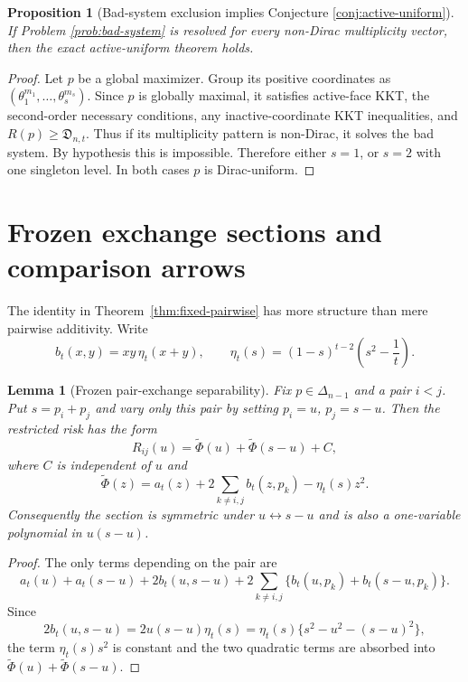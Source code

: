\documentclass[11pt]{article}
\newtheorem{lemma}[theorem]{Lemma}
\newtheorem{proposition}[theorem]{Proposition}
\theoremstyle{definition}
\begin{document}
\begin{proposition}[Bad-system exclusion implies Conjecture \ref{conj:active-uniform}]
If Problem \ref{prob:bad-system} is resolved for every non-Dirac multiplicity vector, then the exact active-uniform theorem holds.
\end{proposition}

\begin{proof}
Let $p$ be a global maximizer.  Group its positive coordinates as $(\theta_1^{m_1},\ldots,\theta_s^{m_s})$.  Since $p$ is globally maximal, it satisfies active-face KKT, the second-order necessary conditions, any inactive-coordinate KKT inequalities, and $R(p)\ge\mathfrak D_{n,t}$.  Thus if its multiplicity pattern is non-Dirac, it solves the bad system.  By hypothesis this is impossible.  Therefore either $s=1$, or $s=2$ with one singleton level.  In both cases $p$ is Dirac-uniform.
\end{proof}


\section{Frozen exchange sections and comparison arrows}\label{sec:exchange-arrows}

The identity in Theorem~\ref{thm:fixed-pairwise} has more structure than
mere pairwise additivity.  Write
\[
  b_t(x,y)=xy\,\eta_t(x+y),
  \qquad
  \eta_t(s)=(1-s)^{t-2}\left(s^2-\frac1t\right).
\]

\begin{lemma}[Frozen pair-exchange separability]\label{lem:frozen-exchange}
Fix $p\in\Delta_{n-1}$ and a pair $i<j$.  Put $s=p_i+p_j$ and vary only
this pair by setting $p_i=u$, $p_j=s-u$.  Then the restricted risk has the
form
\[
  R_{ij}(u)=\widetilde\Phi(u)+\widetilde\Phi(s-u)+C,
\]
where $C$ is independent of $u$ and
\[
  \widetilde\Phi(z)
  =a_t(z)+2\sum_{k\ne i,j}b_t(z,p_k)-\eta_t(s)z^2.
\]
Consequently the section is symmetric under $u\leftrightarrow s-u$ and is
also a one-variable polynomial in $u(s-u)$.
\end{lemma}

\begin{proof}
The only terms depending on the pair are
\[
 a_t(u)+a_t(s-u)+2b_t(u,s-u)
 +2\sum_{k\ne i,j}\{b_t(u,p_k)+b_t(s-u,p_k)\}.
\]
Since
\[
  2b_t(u,s-u)=2u(s-u)\eta_t(s)
  =\eta_t(s)\{s^2-u^2-(s-u)^2\},
\]
the term $\eta_t(s)s^2$ is constant and the two quadratic terms are
absorbed into $\widetilde\Phi(u)+\widetilde\Phi(s-u)$.
\end{proof}
\end{document}
